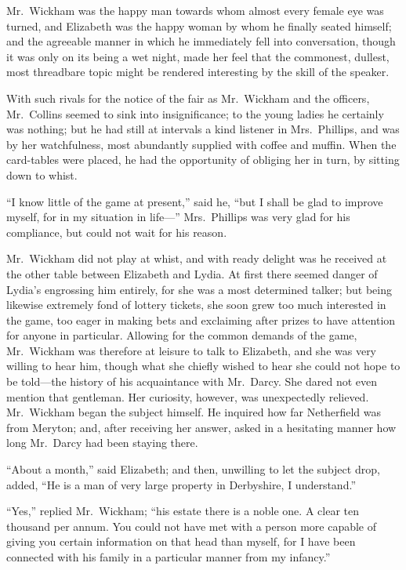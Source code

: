 Mr.\ Wickham was the happy man towards whom almost every
female eye was turned, and Elizabeth was the happy woman by
whom he finally seated himself; and the agreeable manner in
which he immediately fell into conversation, though it was only
on its being a wet night, made her feel that the commonest,
dullest, most threadbare topic might be rendered interesting by
the skill of the speaker.

With such rivals for the notice of the fair as Mr.\ Wickham and
the officers, Mr.\ Collins seemed to sink into insignificance; to
the young ladies he certainly was nothing; but he had still at
intervals a kind listener in Mrs.\ Phillips, and was by her
watchfulness, most abundantly supplied with coffee and muffin.
When the card-tables were placed, he had the opportunity of
obliging her in turn, by sitting down to whist.

``I know little of the game at present,'' said he, ``but I shall be
glad to improve myself, for in my situation in life---'' Mrs.\ Phillips
was very glad for his compliance, but could not wait for his
reason.

Mr.\ Wickham did not play at whist, and with ready delight was he
received at the other table between Elizabeth and Lydia.  At first
there seemed danger of Lydia's engrossing him entirely, for she
was a most determined talker; but being likewise extremely fond
of lottery tickets, she soon grew too much interested in the
game, too eager in making bets and exclaiming after prizes to
have attention for anyone in particular.  Allowing for the
common demands of the game, Mr.\ Wickham was therefore at leisure
to talk to Elizabeth, and she was very willing to hear him,
though what she chiefly wished to hear she could not hope to be
told---the history of his acquaintance with Mr.\ Darcy.  She dared
not even mention that gentleman.  Her curiosity, however, was
unexpectedly relieved.  Mr.\ Wickham began the subject himself.
He inquired how far Netherfield was from Meryton; and, after
receiving her answer, asked in a hesitating manner how long
Mr.\ Darcy had been staying there.

``About a month,'' said Elizabeth; and then, unwilling to let the
subject drop, added, ``He is a man of very large property in
Derbyshire, I understand.''

``Yes,'' replied Mr.\ Wickham; ``his estate there is a noble one.
A clear ten thousand per annum.  You could not have met with a
person more capable of giving you certain information on that
head than myself, for I have been connected with his family in
a particular manner from my infancy.''

